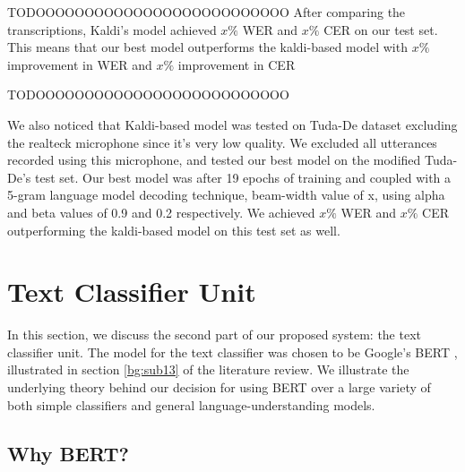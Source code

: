 TODOOOOOOOOOOOOOOOOOOOOOOOOOO
After comparing the transcriptions, Kaldi's model achieved $x\%$ \ac{WER} and  $x\%$ \ac{CER} on our test set. This means that our best model outperforms the kaldi-based model with $x\%$ improvement in \ac{WER} and $x\%$ improvement in \ac{CER}

TODOOOOOOOOOOOOOOOOOOOOOOOOOO

We also noticed that Kaldi-based model was tested on Tuda-De dataset excluding the realteck microphone since it's very low quality. We excluded all utterances recorded using this microphone, and tested our best model on the modified Tuda-De's test set. Our best model was after 19 epochs of training and coupled with a 5-gram language model decoding technique, beam-width value of x, using alpha and beta values of 0.9 and 0.2 respectively. We achieved $x\%$ \ac{WER} and $x\%$ \ac{CER} outperforming the kaldi-based model on this test set as well.


\newpage

\section{Text Classifier Unit} 
\label{meth:s5}

In this section, we discuss the second part of our proposed system: the text classifier unit. The model for the text classifier was chosen to be Google's \acf{BERT} \cite{devlin2018bert}, illustrated in section \ref{bg:sub13} of the literature review. We illustrate the underlying theory behind our decision for using \ac{BERT} over a large variety of both simple classifiers and general language-understanding models.

\subsection{Why BERT?}
\label{meth:s5_sub1}

